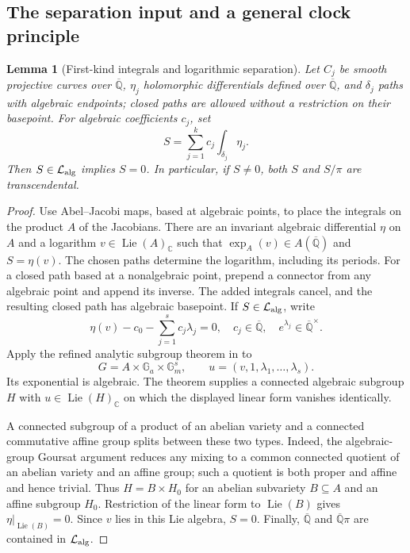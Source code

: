 \documentclass[11pt,a4paper]{article}
\newtheorem{lemma}[theorem]{Lemma}
\theoremstyle{definition}
\theoremstyle{remark}
\numberwithin{equation}{section}
\begin{document}
\subsection{The separation input and a general clock principle}

\begin{lemma}[First-kind integrals and logarithmic separation]
\label{p1:pt:separation}
Let $C_j$ be smooth projective curves over $\overline{\mathbb Q}$,
$\eta_j$ holomorphic differentials defined over $\overline{\mathbb Q}$,
and $\delta_j$ paths with algebraic endpoints; closed paths are allowed
without a restriction on their basepoint.
For algebraic coefficients $c_j$, set
\[
 S=\sum_{j=1}^k c_j\int_{\delta_j}\eta_j.
\]
Then $S\in\mathcal L_{\rm alg}$ implies $S=0$.
In particular, if $S\ne0$, both $S$ and $S/\pi$ are transcendental.
\end{lemma}

\begin{proof}
Use Abel--Jacobi maps, based at algebraic points, to place the integrals
on the product $A$ of the Jacobians.  There are an invariant algebraic
differential $\eta$ on $A$ and a logarithm
$v\in\operatorname{Lie}(A)_{\mathbb C}$ such that
$\exp_A(v)\in A(\overline{\mathbb Q})$ and $S=\eta(v)$.
The chosen paths determine the logarithm, including its periods.
For a closed path based at a nonalgebraic point, prepend a connector
from any algebraic point and append its inverse.  The added integrals
cancel, and the resulting closed path has algebraic basepoint.
If $S\in\mathcal L_{\rm alg}$, write
\[
 \eta(v)-c_0-\sum_{j=1}^s c_j\lambda_j=0,
 \quad c_j\in\overline{\mathbb Q},\quad
 e^{\lambda_j}\in\overline{\mathbb Q}^{\times}.
\]
Apply the refined analytic subgroup theorem in
\cite[Theorem~6.2]{p1:pt-HW} to
\[
 G=A\times\mathbb G_a\times\mathbb G_m^s,
 \qquad u=(v,1,\lambda_1,\ldots,\lambda_s).
\]
Its exponential is algebraic.  The theorem supplies a connected
algebraic subgroup $H$ with $u\in\operatorname{Lie}(H)_{\mathbb C}$
on which the displayed linear form vanishes identically.

A connected subgroup of a product of an abelian variety and a connected
commutative affine group splits between these two types.  Indeed, the
algebraic-group Goursat argument reduces any mixing to a common connected
quotient of an abelian variety and an affine group; such a quotient is
both proper and affine and hence trivial.  Thus $H=B\times H_0$ for an
abelian subvariety $B\subseteq A$ and an affine subgroup $H_0$.
Restriction of the linear form to $\operatorname{Lie}(B)$ gives
$\eta|_{\operatorname{Lie}(B)}=0$.  Since $v$ lies in this Lie algebra,
$S=0$.  Finally, $\overline{\mathbb Q}$ and
$\overline{\mathbb Q}\pi$ are contained in $\mathcal L_{\rm alg}$.
\end{proof}
\end{document}
